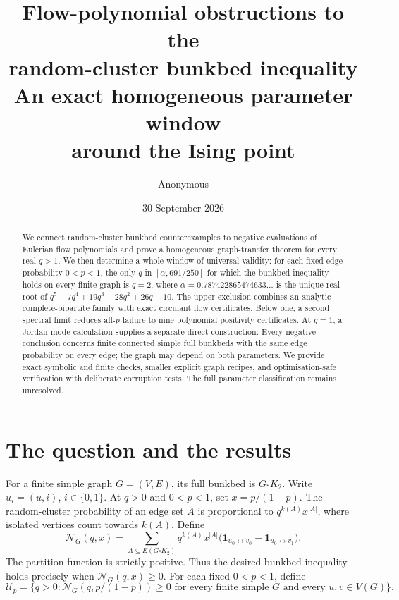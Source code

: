 \documentclass[11pt,a4paper]{article}
\title{\vspace{-10mm}\textbf{Flow-polynomial obstructions to the}\\
\textbf{random-cluster bunkbed inequality}\\[3mm]
{\large An exact homogeneous parameter window\\around the Ising point}}
\author{Anonymous}\date{30 September 2026}
\theoremstyle{remark}\newtheorem{remark}[theorem]{Remark}
\newcommand{\one}{\mathbf 1}\newcommand{\N}{\mathcal N}
\newcommand{\bb}{\square K_2}
\begin{document}
\maketitle\vspace{-7mm}
\begin{abstract}
We connect random-cluster bunkbed counterexamples to negative evaluations of Eulerian flow polynomials and prove a homogeneous graph-transfer theorem for every real $q>1$. We then determine a whole window of universal validity: for each fixed edge probability $0<p<1$, the only $q$ in $[\alpha,691/250]$ for which the bunkbed inequality holds on every finite graph is $q=2$, where $\alpha=0.787422865474633\ldots$ is the unique real root of $q^5-7q^4+19q^3-28q^2+26q-10$. The upper exclusion combines an analytic complete-bipartite family with exact circulant flow certificates. Below one, a second spectral limit reduces all-$p$ failure to nine polynomial positivity certificates. At $q=1$, a Jordan-mode calculation supplies a separate direct construction. Every negative conclusion concerns finite connected simple full bunkbeds with the same edge probability on every edge; the graph may depend on both parameters. We provide exact symbolic and finite checks, smaller explicit graph recipes, and optimisation-safe verification with deliberate corruption tests. The full parameter classification remains unresolved.
\end{abstract}
\vspace{1mm}
\noindent{}

\section{The question and the results}
For a finite simple graph $G=(V,E)$, its full bunkbed is $G\bb$. Write $u_i=(u,i)$, $i\in\{0,1\}$. At $q>0$ and $0<p<1$, set $x=p/(1-p)$. The random-cluster probability of an edge set $A$ is proportional to $q^{k(A)}x^{|A|}$, where isolated vertices count towards $k(A)$. Define
\begin{equation}\label{eq:signed}
\N_G(q,x)=\sum_{A\subseteq E(G\bb)}q^{k(A)}x^{|A|}
\big(\one_{u_0\leftrightarrow v_0}-\one_{u_0\leftrightarrow v_1}\big).
\end{equation}
The partition function is strictly positive. Thus the desired bunkbed inequality holds precisely when $\N_G(q,x)\ge0$.
For each fixed $0<p<1$, define
\[
\mathcal U_p=\{q>0:\N_G(q,p/(1-p))\ge0\text{ for every finite simple }G\text{ and every }u,v\in V(G)\}.
\]
\end{document}
